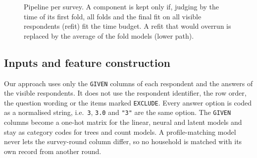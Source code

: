 \documentclass{article}
\begin{document}
\begin{figure}[h]
  \centering
  \small
  \caption{Pipeline per survey. A component is kept only if, judging by the time of its first fold, all folds and the final fit on all visible respondents (refit) fit the time budget. A refit that would overrun is replaced by the average of the fold models (lower path).}
  \label{fig:pipeline}
\end{figure}

\subsection{Inputs and feature construction}
Our approach uses only the \texttt{GIVEN} columns of each respondent and the answers of the visible
respondents. It does not use the respondent identifier, the row order, the question wording or the
items marked \texttt{EXCLUDE}. Every answer option is coded as a normalised string, i.e.\ \texttt{3},
\texttt{3.0} and \texttt{"3"} are the same option. The \texttt{GIVEN} columns become a one-hot
matrix for the linear, neural and latent models and stay as category codes for trees and count
models. A profile-matching model never lets the survey-round
column differ, so no household is matched with its own record from another round.
\end{document}
